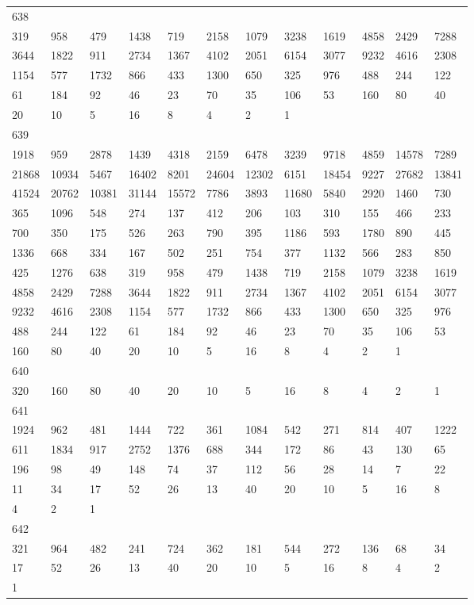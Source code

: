 \begin{longtable}{llllllllllll}
638&&&&&&&&&&&\\
319& 958& 479& 1438& 719& 2158& 1079& 3238& 1619& 4858& 2429& 7288\\
3644& 1822& 911& 2734& 1367& 4102& 2051& 6154& 3077& 9232& 4616& 2308\\
1154& 577& 1732& 866& 433& 1300& 650& 325& 976& 488& 244& 122\\
61& 184& 92& 46& 23& 70& 35& 106& 53& 160& 80& 40\\
20& 10& 5& 16& 8& 4& 2& 1& \\

639&&&&&&&&&&&\\
1918& 959& 2878& 1439& 4318& 2159& 6478& 3239& 9718& 4859& 14578& 7289\\
21868& 10934& 5467& 16402& 8201& 24604& 12302& 6151& 18454& 9227& 27682& 13841\\
41524& 20762& 10381& 31144& 15572& 7786& 3893& 11680& 5840& 2920& 1460& 730\\
365& 1096& 548& 274& 137& 412& 206& 103& 310& 155& 466& 233\\
700& 350& 175& 526& 263& 790& 395& 1186& 593& 1780& 890& 445\\
1336& 668& 334& 167& 502& 251& 754& 377& 1132& 566& 283& 850\\
425& 1276& 638& 319& 958& 479& 1438& 719& 2158& 1079& 3238& 1619\\
4858& 2429& 7288& 3644& 1822& 911& 2734& 1367& 4102& 2051& 6154& 3077\\
9232& 4616& 2308& 1154& 577& 1732& 866& 433& 1300& 650& 325& 976\\
488& 244& 122& 61& 184& 92& 46& 23& 70& 35& 106& 53\\
160& 80& 40& 20& 10& 5& 16& 8& 4& 2& 1& \\

640&&&&&&&&&&&\\
320& 160& 80& 40& 20& 10& 5& 16& 8& 4& 2& 1\\

641&&&&&&&&&&&\\
1924& 962& 481& 1444& 722& 361& 1084& 542& 271& 814& 407& 1222\\
611& 1834& 917& 2752& 1376& 688& 344& 172& 86& 43& 130& 65\\
196& 98& 49& 148& 74& 37& 112& 56& 28& 14& 7& 22\\
11& 34& 17& 52& 26& 13& 40& 20& 10& 5& 16& 8\\
4& 2& 1& \\

642&&&&&&&&&&&\\
321& 964& 482& 241& 724& 362& 181& 544& 272& 136& 68& 34\\
17& 52& 26& 13& 40& 20& 10& 5& 16& 8& 4& 2\\
1& \\


\end{longtable}
